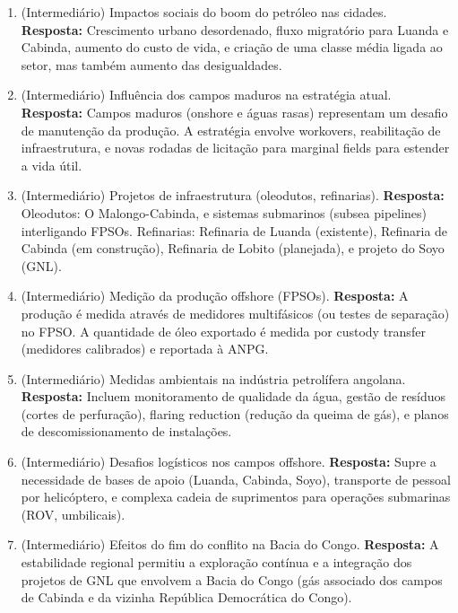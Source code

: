 \documentclass[11pt,a4paper]{article}
\begin{document}
\begin{enumerate}
  \item (Intermediário) Impactos sociais do boom do petróleo nas cidades.
  \textbf{Resposta:} Crescimento urbano desordenado, fluxo migratório para Luanda e Cabinda, aumento do custo de vida, e criação de uma classe média ligada ao setor, mas também aumento das desigualdades.

  \item (Intermediário) Influência dos campos maduros na estratégia atual.
  \textbf{Resposta:} Campos maduros (onshore e águas rasas) representam um desafio de manutenção da produção. A estratégia envolve workovers, reabilitação de infraestrutura, e novas rodadas de licitação para marginal fields para estender a vida útil.

  \item (Intermediário) Projetos de infraestrutura (oleodutos, refinarias).
  \textbf{Resposta:} Oleodutos: O Malongo-Cabinda, e sistemas submarinos (subsea pipelines) interligando FPSOs. Refinarias: Refinaria de Luanda (existente), Refinaria de Cabinda (em construção), Refinaria de Lobito (planejada), e projeto do Soyo (GNL).

  \item (Intermediário) Medição da produção offshore (FPSOs).
  \textbf{Resposta:} A produção é medida através de medidores multifásicos (ou testes de separação) no FPSO. A quantidade de óleo exportado é medida por custody transfer (medidores calibrados) e reportada à ANPG.

  \item (Intermediário) Medidas ambientais na indústria petrolífera angolana.
  \textbf{Resposta:} Incluem monitoramento de qualidade da água, gestão de resíduos (cortes de perfuração), flaring reduction (redução da queima de gás), e planos de descomissionamento de instalações.

  \item (Intermediário) Desafios logísticos nos campos offshore.
  \textbf{Resposta:} Supre a necessidade de bases de apoio (Luanda, Cabinda, Soyo), transporte de pessoal por helicóptero, e complexa cadeia de suprimentos para operações submarinas (ROV, umbilicais).

  \item (Intermediário) Efeitos do fim do conflito na Bacia do Congo.
  \textbf{Resposta:} A estabilidade regional permitiu a exploração contínua e a integração dos projetos de GNL que envolvem a Bacia do Congo (gás associado dos campos de Cabinda e da vizinha República Democrática do Congo).


\end{enumerate}
\end{document}
